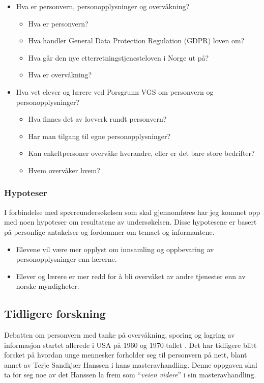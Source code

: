 \begin{itemize}
    \item Hva er personvern, personopplysninger og overvåkning?
    \begin{itemize}
        \item Hva er personvern?
        \item Hva handler General Data Protection Regulation (GDPR) loven om?
        \item Hva går den nye etterretningstjenesteloven i Norge ut på?
        \item Hva er overvåkning?
    \end{itemize}
    \item Hva vet elever og lærere ved Porsgrunn VGS om personvern og personopplysninger?
    \begin{itemize}
        \item Hva finnes det av lovverk rundt personvern?
        \item Har man tilgang til egne personopplysninger?
        \item Kan enkeltpersoner overvåke hverandre, eller er det bare store bedrifter? 
        \item Hvem overvåker hvem?
    \end{itemize}
\end{itemize}

\subsubsection{Hypoteser}\label{subsubsec:hypoteser}
I forbindelse med spørreundersøkelsen som skal gjennomføres har jeg kommet opp med noen hypoteser om resultatene av undersøkelsen. Disse hypotesene er basert på personlige antakelser og fordommer om temaet og informantene.

\begin{itemize}
    \item Elevene vil være mer opplyst om innsamling og oppbevaring av personopplysninger enn lærerne.
    \item Elever og lærere er mer redd for å bli overvåket av andre tjenester enn av norske myndigheter.
\end{itemize}

\subsection{Tidligere forskning}
Debatten om personvern med tanke på overvåkning, sporing og lagring av informasjon startet allerede i USA på 1960 og 1970-tallet \parencite[36]{bok:nissenbaum}. Det har tidligere blitt forsket på hvordan unge mennesker forholder seg til personvern på nett, blant annet av Terje Sandkjær Hanssen i hans masteravhandling. Denne oppgaven skal ta for seg noe av det Hanssen la frem som ``\textit{veien videre}'' i sin masteravhandling. \parencite{master:hanssen}

